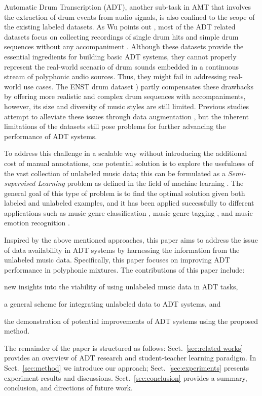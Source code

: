 \documentclass{article}
\begin{document}
Automatic Drum Transcription (ADT), another sub-task in AMT that involves the extraction of drum events from audio signals, is also confined to the scope of the existing labeled datasets. As Wu points out \cite{Wu2016}, most of the ADT related datasets focus on collecting recordings of single drum hits \cite{Tindale2004, Prockup2013} and simple drum sequences without any accompaniment \cite{Dittmar2014}. Although these datasets provide the essential ingredients for building basic ADT systems, they cannot properly represent the real-world scenario of drum sounds embedded in a continuous stream of polyphonic audio sources. Thus, they might fail in addressing real-world use cases. The ENST drum dataset \cite{Gillet2006}) partly compensates these drawbacks by offering more realistic and complex drum sequences with accompaniments, however, its size and diversity of music styles are still limited. Previous studies attempt to alleviate these issues through data augmentation \cite{Wu2016, Vogl2017}, but the inherent limitations of the datasets still pose problems for further advancing the performance of ADT systems. 

To address this challenge in a scalable way without introducing the additional cost of manual annotations, one potential solution is to explore the usefulness of the vast collection of unlabeled music data; this can be formulated as a \textit{Semi-supervised Learning} problem as defined in the field of machine learning \cite{Chapelle2006}. The general goal of this type of problem is to find the optimal solution given both labeled and unlabeled examples, and it has been applied successfully to different applications such as music genre classification \cite{Raina2007a}, music genre tagging \cite{Jao2015}, and music emotion recognition \cite{Wu2013a}.

Inspired by the above mentioned approaches, this paper aims to address the issue of data availability in ADT systems by harnessing the information from the unlabeled music data. Specifically, this paper focuses on improving ADT performance in polyphonic mixtures. The contributions of this paper include: 
\begin{inparaenum}[(i)]
	\item   new insights into the viability of using unlabeled music data in ADT tasks, 
    \item   a general scheme for integrating unlabeled data to ADT systems, and 
    \item   the demonstration of potential improvements of ADT systems using the proposed method.
\end{inparaenum} 
The remainder of the paper is structured as follows: Sect.~\ref{sec:related works} provides an overview of ADT research and student-teacher learning paradigm. In Sect.~\ref{sec:method} we introduce our approach; Sect.~\ref{sec:experiments} presents experiment results and discussions. Sect.~\ref{sec:conclusion} provides a summary, conclusion, and directions of future work.
\end{document}
